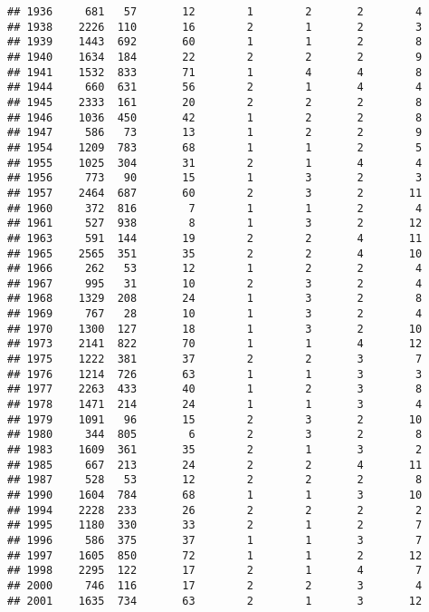 \documentclass[]{article}
\begin{document}
\begin{verbatim}
## 1936     681   57       12        1        2       2        4
## 1938    2226  110       16        2        1       2        3
## 1939    1443  692       60        1        1       2        8
## 1940    1634  184       22        2        2       2        9
## 1941    1532  833       71        1        4       4        8
## 1944     660  631       56        2        1       4        4
## 1945    2333  161       20        2        2       2        8
## 1946    1036  450       42        1        2       2        8
## 1947     586   73       13        1        2       2        9
## 1954    1209  783       68        1        1       2        5
## 1955    1025  304       31        2        1       4        4
## 1956     773   90       15        1        3       2        3
## 1957    2464  687       60        2        3       2       11
## 1960     372  816        7        1        1       2        4
## 1961     527  938        8        1        3       2       12
## 1963     591  144       19        2        2       4       11
## 1965    2565  351       35        2        2       4       10
## 1966     262   53       12        1        2       2        4
## 1967     995   31       10        2        3       2        4
## 1968    1329  208       24        1        3       2        8
## 1969     767   28       10        1        3       2        4
## 1970    1300  127       18        1        3       2       10
## 1973    2141  822       70        1        1       4       12
## 1975    1222  381       37        2        2       3        7
## 1976    1214  726       63        1        1       3        3
## 1977    2263  433       40        1        2       3        8
## 1978    1471  214       24        1        1       3        4
## 1979    1091   96       15        2        3       2       10
## 1980     344  805        6        2        3       2        8
## 1983    1609  361       35        2        1       3        2
## 1985     667  213       24        2        2       4       11
## 1987     528   53       12        2        2       2        8
## 1990    1604  784       68        1        1       3       10
## 1994    2228  233       26        2        2       2        2
## 1995    1180  330       33        2        1       2        7
## 1996     586  375       37        1        1       3        7
## 1997    1605  850       72        1        1       2       12
## 1998    2295  122       17        2        1       4        7
## 2000     746  116       17        2        2       3        4
## 2001    1635  734       63        2        1       3       12

\end{verbatim}
\end{document}
